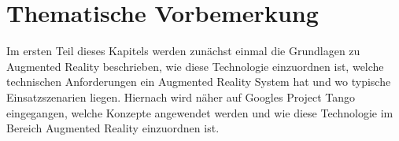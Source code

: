 \chapter{Thematische Vorbemerkung}

Im ersten Teil dieses Kapitels werden zunächst einmal die Grundlagen zu Augmented Reality beschrieben, wie diese Technologie einzuordnen ist, welche technischen Anforderungen ein Augmented Reality System hat und wo typische Einsatzszenarien liegen. Hiernach wird näher auf Googles Project Tango eingegangen, welche Konzepte angewendet werden und wie diese Technologie im Bereich Augmented Reality einzuordnen ist. \\






